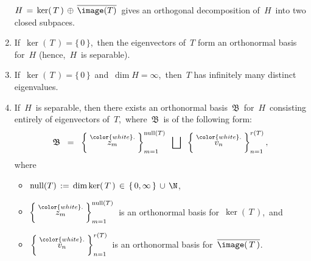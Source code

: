 \begin{theorem}
\begin{enumerate}
	$H \,=\, \ker\!\left(\,T\,\right) \,\oplus\, \overline{\image(T)}$\,
	gives an orthogonal decomposition of \,$H$\, into two closed subpaces.
\item
	If \,$\ker(\,T\,) = \{\,0\,\}$,\, then the eigenvectors of \,$T$ form an orthonormal basis for \,$H$
	(hence, \,$H$\, is separable).
\item
	If \,$\ker(\,T\,) = \{\,0\,\}$\, and \,$\dim H = \infty$,\,
	then \,$T$ has infinitely many distinct eigenvalues.
\item
	If \,$H$\, is separable, then there exists an orthonormal basis \,$\mathfrak{B}$\, for \,$H$\,
	consisting entirely of eigenvectors of \,$T$,\, where \,$\mathfrak{B}$\, is of the following form:
	\begin{equation*}
	\mathfrak{B}
	\;\; = \;\;
		\left\{\;\overset{{\color{white}.}}{z_{m}}\;\right\}_{m =1}^{\textnormal{null}(T)}
		\;\;\bigsqcup\;\;
		\left\{\;\overset{{\color{white}.}}{v_{n}}\;\right\}_{n =1}^{r(T)},
	\end{equation*}
	where
	\begin{itemize}
	\item
		$\textnormal{null}(T) \,:=\, \dim\ker(\,T\,) \,\in\, \{\,0,\infty\,\}\,\cup\,\N$,\,
	\item
		$\left\{\;\overset{{\color{white}.}}{z_{m}}\;\right\}_{m =1}^{\textnormal{null}(T)}$\,
		is an orthonormal basis for \,$\ker(\,T\,)$,\, and
	\item
		\,$\left\{\;\overset{{\color{white}.}}{v_{n}}\;\right\}_{n =1}^{r(T)}$\,
		is an orthonormal basis for
		\,$\overline{\image(\,T\,)}$.\,
	\end{itemize}
\end{enumerate}
\end{theorem}

